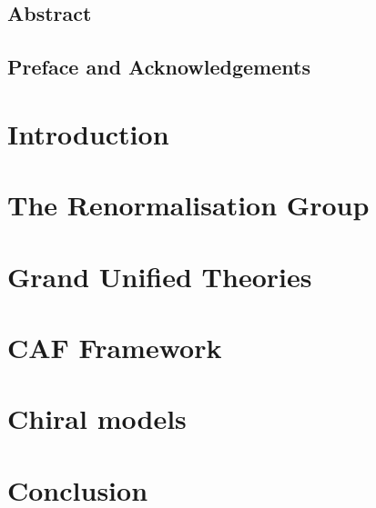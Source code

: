 \documentclass[11pt, a4paper]{book}
\numberwithin{equation}{chapter}
\begin{document}


\section*{Abstract}


\thispagestyle{empty}

\setcounter{tocdepth}{1}

\thispagestyle{empty}
\tableofcontents
\newpage
\section*{Preface and Acknowledgements}


\newpage
\chapter{Introduction}



\chapter{The Renormalisation Group}
\label{chap:RG}

\chapter{Grand Unified Theories}
\label{chap:GUT}


\chapter{CAF Framework}
\label{chap:CAF}





\chapter{Chiral models}
\label{chap:chiralmodels}




\chapter{Conclusion}
\label{chap:conc}


\printbibliography[heading=bibintoc]
\end{document}
